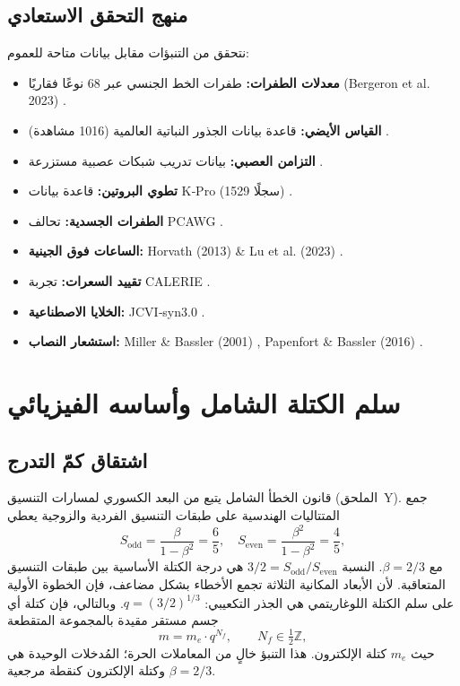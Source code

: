 \documentclass[11pt,a4paper]{article}
\begin{document}
	\subsection{منهج التحقق الاستعادي}
	
	نتحقق من التنبؤات مقابل بيانات متاحة للعموم:
	\begin{itemize}
		\item \textbf{معدلات الطفرات:} طفرات الخط الجنسي عبر 68 نوعًا فقاريًا (Bergeron et al. 2023) \cite{Bergeron2023a}.
		\item \textbf{القياس الأيضي:} قاعدة بيانات الجذور النباتية العالمية (1016 مشاهدة) \cite{Yuan2020}.
		\item \textbf{التزامن العصبي:} بيانات تدريب شبكات عصبية مستزرعة \cite{PLOS2025b}.
		\item \textbf{تطوي البروتين:} قاعدة بيانات K‑Pro (1529 سجلًا) \cite{Turina2023}.
		\item \textbf{الطفرات الجسدية:} تحالف PCAWG \cite{PCAWG2020}.
		\item \textbf{الساعات فوق الجينية:} Horvath (2013) \& Lu et al. (2023) \cite{Horvath2013, Lu2023}.
		\item \textbf{تقييد السعرات:} تجربة CALERIE \cite{CALERIE2018, CALERIE2024}.
		\item \textbf{الخلايا الاصطناعية:} JCVI‑syn3.0 \cite{Hutchison2016, Pelletier2023}.
		\item \textbf{استشعار النصاب:} Miller \& Bassler (2001) \cite{Miller2001}, Papenfort \& Bassler (2016) \cite{Papenfort2016}.
	\end{itemize}
	
	\section{سلم الكتلة الشامل وأساسه الفيزيائي}
	
	\subsection{اشتقاق كمّ التدرج}
	
	قانون الخطأ الشامل يتبع من البعد الكسوري لمسارات التنسيق (الملحق~Y). جمع المتتاليات الهندسية على طبقات التنسيق الفردية والزوجية يعطي
	\[
	S_{\mathrm{odd}} = \frac{\beta}{1-\beta^2} = \frac{6}{5}, \quad
	S_{\mathrm{even}} = \frac{\beta^2}{1-\beta^2} = \frac{4}{5},
	\]
	مع \(\beta = 2/3\). النسبة \(3/2 = S_{\mathrm{odd}}/S_{\mathrm{even}}\) هي درجة الكتلة الأساسية بين طبقات التنسيق المتعاقبة. لأن الأبعاد المكانية الثلاثة تجمع الأخطاء بشكل مضاعف، فإن الخطوة الأولية على سلم الكتلة اللوغاريتمي هي الجذر التكعيبي: \(q = (3/2)^{1/3}\). وبالتالي، فإن كتلة أي جسم مستقر مقيدة بالمجموعة المتقطعة
	\begin{equation}
		m = m_e \cdot q^{N_f}, \qquad N_f \in \tfrac12\mathbb{Z},
		\label{eq:quantization}
	\end{equation}
	حيث \(m_e\) كتلة الإلكترون. هذا التنبؤ خالٍ من المعاملات الحرة؛ المُدخلات الوحيدة هي \(\beta = 2/3\) وكتلة الإلكترون كنقطة مرجعية.
	
\end{document}
